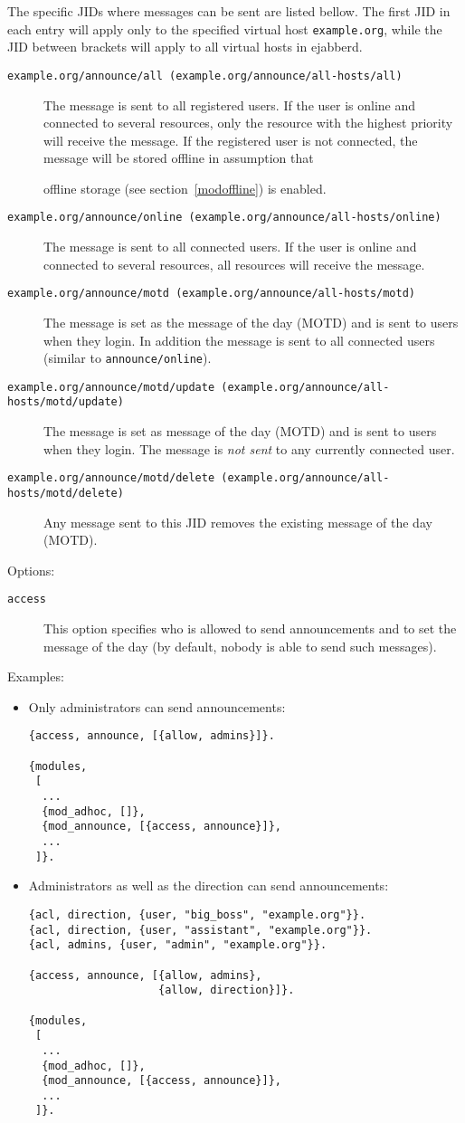 \documentclass[a4paper,10pt]{book}
\newcommand{\ind}[1]{\begin{latexonly}\index{#1}\end{latexonly}}
\newcommand{\bracehack}{\def\{{\char"7B}\def\}{\char"7D}}
\newcommand{\titem}[1]{\item[\bracehack\texttt{#1}]}
\newcommand{\jid}[1]{\texttt{#1}}
\newcommand{\term}[1]{\texttt{#1}}
\newcommand{\module}[1]{\texttt{#1}}
\newcommand{\modoffline}{\module{mod\_offline}}
\begin{document}
The specific JIDs where messages can be sent are listed bellow.
The first JID in each entry will apply only to the specified virtual host
\jid{example.org}, while the JID between brackets will apply to all virtual
hosts in ejabberd.
\begin{description}
\titem{example.org/announce/all (example.org/announce/all-hosts/all)} The
  message is sent to all registered users. If the user is online and connected
  to several resources, only the resource with the highest priority will receive
  the message. If the registered user is not connected, the message will be
  stored offline in assumption that \ind{modules!\modoffline{}}offline storage
  (see section~\ref{modoffline}) is enabled.
\titem{example.org/announce/online (example.org/announce/all-hosts/online)}The
  message is sent to all connected users. If the user is online and connected
  to several resources, all resources will receive the message.
\titem{example.org/announce/motd (example.org/announce/all-hosts/motd)}The
  message is set as the message of the day (MOTD) and is sent to users when they
  login. In addition the message is sent to all connected users (similar to
  \term{announce/online}).
\titem{example.org/announce/motd/update (example.org/announce/all-hosts/motd/update)}
  The message is set as message of the day (MOTD) and is sent to users when they
  login. The message is \emph{not sent} to any currently connected user.
\titem{example.org/announce/motd/delete (example.org/announce/all-hosts/motd/delete)}
  Any message sent to this JID removes the existing message of the day (MOTD).
\end{description}

Options:
\begin{description}
\titem{access} \ind{options!access}This option specifies who is allowed to
  send announcements and to set the message of the day (by default, nobody is
  able to send such messages).
\end{description}

Examples:
\begin{itemize}
\item Only administrators can send announcements:
\begin{verbatim}
{access, announce, [{allow, admins}]}.

{modules,
 [
  ...
  {mod_adhoc, []},
  {mod_announce, [{access, announce}]},
  ...
 ]}.
\end{verbatim}
\item Administrators as well as the direction can send announcements:
\begin{verbatim}
{acl, direction, {user, "big_boss", "example.org"}}.
{acl, direction, {user, "assistant", "example.org"}}.
{acl, admins, {user, "admin", "example.org"}}.

{access, announce, [{allow, admins},
                    {allow, direction}]}.

{modules,
 [
  ...
  {mod_adhoc, []},
  {mod_announce, [{access, announce}]},
  ...
 ]}.
\end{verbatim}
\end{itemize}
\end{document}

